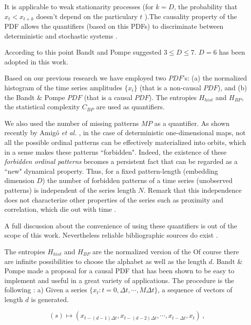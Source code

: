 It is applicable to weak stationarity processes (for
$k=D$, the probability that $x_t < x_{t+k}$ doesn't depend on the
particulary $t$ \cite{Pompe2002}).The causality property of the
PDF allows the quantifiers (based on this PDFs) to discriminate
between deterministic and stochastic systems \cite{Rosso2007B}.

According to this point Bandt and Pompe suggested $3\leq D \leq
7$. $D=6$ has been adopted in this work.

Based on our previous research \cite{DeMicco2008,DeMicco2009} we have employed two $PDF$'s: (a) the normalized histogram of the time series amplitudes $\{x_i\}$ (that is a non-causal $PDF$), and (b) the Bandt \& Pompe $PDF$ (that is a causal $PDF$).
The entropies $H_{hist}$ and $H_{BP}$, the statistical complexity $C_{BP}$  are used as quantifiers.  

We also used the number of missing patterns $MP$ as a quantifier\cite{Rosso2012}. As shown recently by Amig\'o {\it et al.\/}
\cite{Amigo2006,Amigo2007,Amigo2008,Amigo2010},  in the case of
deterministic one-dimensional maps, not all the possible ordinal patterns
can be effectively materialized into orbits, which in a sense
makes these patterns ``forbidden". Indeed, the existence of these
{\it forbidden ordinal patterns\/} becomes a persistent fact that
can be regarded as a ``new" dynamical property. Thus, for a fixed
pattern-length (embedding dimension $D$) the number of forbidden
patterns of a time series (unobserved patterns) is independent of
the series length $N$. Remark that this independence does not
characterize other properties of the series such as proximity and
correlation, which die out with time \cite{Amigo2007,Amigo2010}.

A full discussion about the convenience of using these quantifiers is
out of the scope of this work. Nevertheless reliable bibliographic
sources do exist
\cite{Wackerbauer1994,Lopez1995,Rosso2007A,DeMicco2008,Rosso2009,Martin2006,Rosso2012}.

The entropies $H_{hist}$ and $H_{BP}$ are the normalized version of the  Of course there are infinite possibilities to choose the alphabet as well as the length $d$.
Bandt \& Pompe made a proposal for a causal PDF that has been shown to be easy to implement and useful in a great variety of applications.  The procedure is the
following \cite{Pompe2002,Keller2003,Keller2005}: a) Given a
series $\{x_t : t=0, \Delta t, \cdots,M\Delta t \}$, a sequence of
vectors of length $d$ is generated.

\begin{equation}
\label{eq:vectores}
(s)\mapsto \left(x_{t-(d-1)\Delta t},x_{t-(d-2)\Delta t},\cdots,x_{t-\Delta t},x_{t}\right) \ ,
\end{equation}

